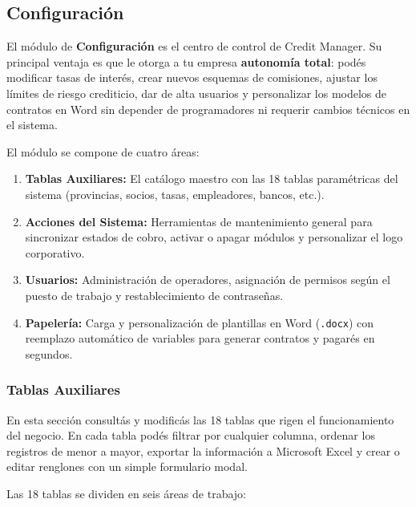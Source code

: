 \documentclass[12pt,a4paper]{article}
\renewcommand{\_}{\textunderscore\allowbreak}
\begin{document}
\subsection{Configuración}

El módulo de \textbf{Configuración} es el centro de control de Credit Manager. Su principal ventaja es que le otorga a tu empresa \textbf{autonomía total}: podés modificar tasas de interés, crear nuevos esquemas de comisiones, ajustar los límites de riesgo crediticio, dar de alta usuarios y personalizar los modelos de contratos en Word sin depender de programadores ni requerir cambios técnicos en el sistema.

El módulo se compone de cuatro áreas:
\begin{enumerate}
    \item \textbf{Tablas Auxiliares:} El catálogo maestro con las 18 tablas paramétricas del sistema (provincias, socios, tasas, empleadores, bancos, etc.).
    \item \textbf{Acciones del Sistema:} Herramientas de mantenimiento general para sincronizar estados de cobro, activar o apagar módulos y personalizar el logo corporativo.
    \item \textbf{Usuarios:} Administración de operadores, asignación de permisos según el puesto de trabajo y restablecimiento de contraseñas.
    \item \textbf{Papelería:} Carga y personalización de plantillas en Word (\texttt{.docx}) con reemplazo automático de variables para generar contratos y pagarés en segundos.
\end{enumerate}

\subsubsection{Tablas Auxiliares}
En esta sección consultás y modificás las 18 tablas que rigen el funcionamiento del negocio. En cada tabla podés filtrar por cualquier columna, ordenar los registros de menor a mayor, exportar la información a Microsoft Excel y crear o editar renglones con un simple formulario modal.

Las 18 tablas se dividen en seis áreas de trabajo:
\end{document}
